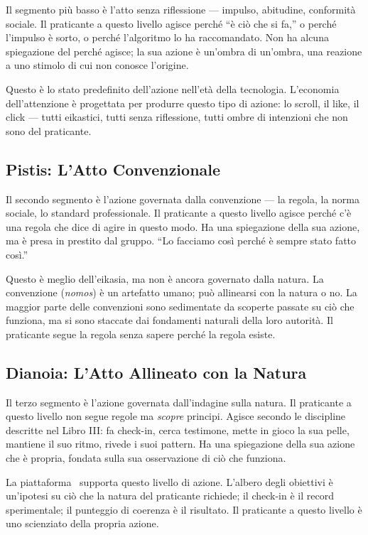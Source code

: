 Il segmento pi\`u basso \`e l'atto senza riflessione --- impulso,
abitudine, conformit\`a sociale. Il praticante a questo livello agisce
perch\'e ``\`e ci\`o che si fa,'' o perch\'e l'impulso \`e sorto, o
perch\'e l'algoritmo lo ha raccomandato. Non ha alcuna spiegazione del
perch\'e agisce; la sua azione \`e un'ombra di un'ombra, una reazione
a uno stimolo di cui non conosce l'origine.

Questo \`e lo stato predefinito dell'azione nell'et\`a della tecnologia.
L'economia dell'attenzione \`e progettata per produrre questo tipo di
azione: lo scroll, il like, il click --- tutti eikastici, tutti senza
riflessione, tutti ombre di intenzioni che non sono del praticante.

\subsection{Pistis: L'Atto Convenzionale}

Il secondo segmento \`e l'azione governata dalla convenzione --- la
regola, la norma sociale, lo standard professionale. Il praticante a
questo livello agisce perch\'e c'\`e una regola che dice di agire in
questo modo. Ha una spiegazione della sua azione, ma \`e presa in
prestito dal gruppo. ``Lo facciamo cos\`i perch\'e \`e sempre stato
fatto cos\`i.''

Questo \`e meglio dell'eikasia, ma non \`e ancora governato dalla
natura. La convenzione (\emph{nomos}) \`e un artefatto umano; pu\`o
allinearsi con la natura o no. La maggior parte delle convenzioni sono
sedimentate da scoperte passate su ci\`o che funziona, ma si sono
staccate dai fondamenti naturali della loro autorit\`a. Il praticante
segue la regola senza sapere perch\'e la regola esiste.

\subsection{Dianoia: L'Atto Allineato con la Natura}

Il terzo segmento \`e l'azione governata dall'indagine sulla natura.
Il praticante a questo livello non segue regole ma \emph{scopre}
principi. Agisce secondo le discipline descritte nel Libro III: fa
check-in, cerca testimone, mette in gioco la sua pelle, mantiene il
suo ritmo, rivede i suoi pattern. Ha una spiegazione della sua azione
che \`e propria, fondata sulla sua osservazione di ci\`o che funziona.

La piattaforma \praxis\ supporta questo livello di azione. L'albero
degli obiettivi \`e un'ipotesi su ci\`o che la natura del praticante
richiede; il check-in \`e il record sperimentale; il punteggio di
coerenza \`e il risultato. Il praticante a questo livello \`e uno
scienziato della propria azione.

